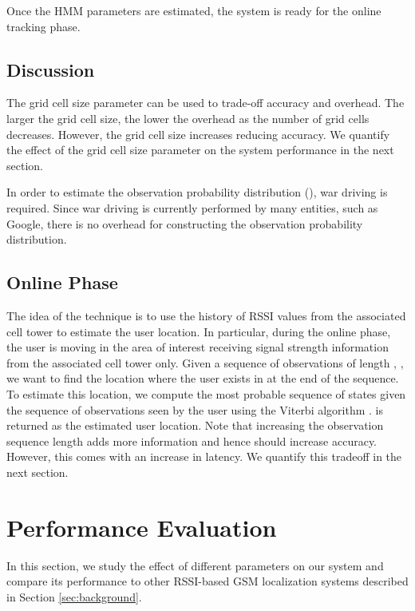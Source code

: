 \documentclass[conference]{IEEEtran}
\begin{document}
Once the HMM parameters are estimated, the system is ready for the
online tracking phase.

\subsection{Discussion}
The grid cell size parameter can be used to trade-off accuracy and
overhead. The larger the grid cell size, the lower the overhead as
the number of grid cells decreases. However, the grid cell size
increases reducing accuracy. We quantify the effect of the grid cell
size parameter on the system performance in the next section.

In order to estimate the observation probability distribution (),
war driving is required. Since war driving is currently performed by
many entities, such as Google, there is no overhead for constructing
the observation probability distribution.
\subsection{Online Phase}
The idea of the technique is to use the history of RSSI values from
the associated cell tower to estimate the user location. In
particular, during the online phase, the user is moving in the area
of interest receiving signal strength information from the
associated cell tower only. Given a sequence of observations of
length , , we want to find the location
where the user exists in at the end of the sequence. To estimate
this location, we compute the most probable sequence of states  given the sequence of observations seen by the user
using the Viterbi algorithm \cite{viterbi}.  is returned as the
estimated user location. Note that increasing the observation
sequence length adds more information and hence should increase
accuracy. However, this comes with an increase in latency. We
quantify this tradeoff in the next section.



\section{Performance Evaluation}\label{results}
In this section, we study the effect of different parameters on our
system and compare its performance to other RSSI-based GSM
localization systems described in Section \ref{sec:background}.
\end{document}
